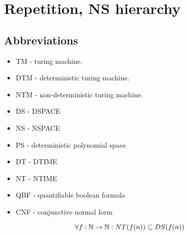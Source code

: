 \section{\texorpdfstring{Repetition, NS hierarchy}{Repetition, NS hierarchy}}
\vspace{5mm}
\large

\subsection{Abbreviations}
\begin{itemize}
	\item TM - turing machine.
	\item DTM - deterministic turing machine.
	\item NTM - non-deterministic turing machine.
	\item DS - DSPACE
	\item NS - NSPACE
	\item PS - deterministic polynomial space
	\item DT - DTIME
	\item NT - NTIME
	\item QBF - quantifiable boolean formula
	\item CNF - conjunctive normal form
\end{itemize}

\begin{theorem}\label{nt_ds_rel}
	\[ \forall f:\operatorname{\mathbb{N}} \to \operatorname{\mathbb{N}}: NT(f(n)) \subseteq DS(f(n)) \]
\end{theorem}

